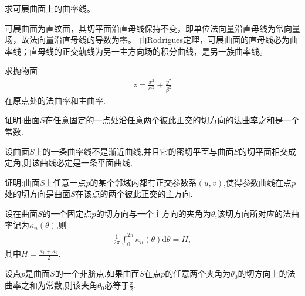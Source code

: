 \documentclass[../../main.tex]{subfiles}%
\begin{document}
\begin{example}
求可展曲面上的曲率线。
\end{example}
\begin{solution}

可展曲面为直纹面，其切平面沿直母线保持不变，即单位法向量沿直母线为常向量场，故法向量沿直母线的导数为零。
由Rodrigues定理，可展曲面的直母线必为曲率线；直母线的正交轨线为另一主方向场的积分曲线，是另一族曲率线。

\end{solution}

\begin{example}
求抛物面
\begin{align*}
z=\frac{x^2}{\alpha^2}+\frac{y^2}{\beta^2}
\end{align*}
在原点处的法曲率和主曲率.
\end{example}

\begin{example}
证明:曲面$S$在任意固定的一点处沿任意两个彼此正交的切方向的法曲率之和是一个常数.
\end{example}

\begin{example}
设曲面$S$上的一条曲率线不是渐近曲线,并且它的密切平面与曲面$S$的切平面相交成定角,则该曲线必定是一条平面曲线.
\end{example}

\begin{example}
证明:曲面$S$上任意一点$p$的某个邻域内都有正交参数系$(u,v)$,使得参数曲线在点$p$处的切方向是曲面$S$在该点的两个彼此正交的主方向.
\end{example}

\begin{example}
设在曲面$S$的一个固定点$p$的切方向与一个主方向的夹角为$\theta$,该切方向所对应的法曲率记为$\kappa_n(\theta)$,则
\begin{align*}
\frac{1}{2\pi}\int_{0}^{2\pi}\kappa_n(\theta)\mathrm{d}\theta = H,
\end{align*}
其中$H=\frac{\kappa_1+\kappa_2}{2}$.
\end{example}

\begin{example}
设点$p$是曲面$S$的一个非脐点.如果曲面$S$在点$p$的任意两个夹角为$\theta_0$的切方向上的法曲率之和为常数,则该夹角$\theta_0$必等于$\frac{\pi}{2}$.
\end{example}
\end{document}
